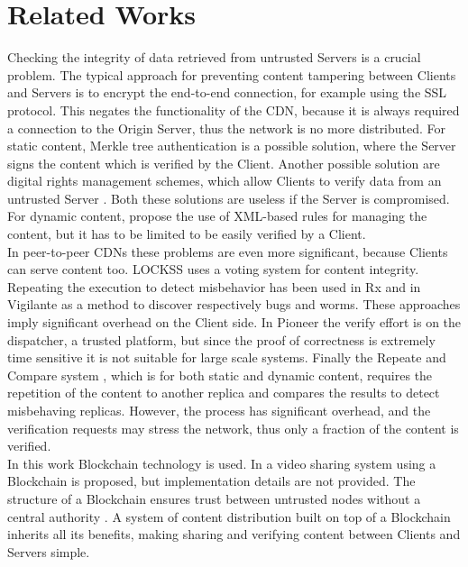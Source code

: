 \documentclass[hidelinks,conference,compsoc]{IEEEtran}
\begin{document}
\section{Related Works}
Checking the integrity of data retrieved from untrusted Servers is a crucial problem. The typical approach for preventing content tampering between Clients and Servers is to encrypt the end-to-end connection, for example using the SSL protocol.
This negates the functionality of the CDN, because it is always required a connection to the Origin Server, thus the network is no more distributed. For static content, Merkle tree authentication \cite{bayardo2005merkle} is a possible solution, where the Server signs the content which is verified by the Client. Another possible solution are digital rights management schemes, which allow Clients to verify data from an untrusted Server \cite{adelsbach2005towards}. Both these solutions are useless if the Server is compromised. 
For dynamic content, \cite{chi2002xml}\cite{orman2001data} propose the use of XML-based rules for managing the content, but it has to be limited to be easily verified by a Client.\\
In peer-to-peer CDNs these problems are even more significant, because Clients can serve content too. LOCKSS\cite{maniatis2003preserving} uses a voting system for content integrity. 
Repeating the execution to detect misbehavior has been used in Rx\cite{qin2005rx} and in Vigilante \cite{costa2005vigilante} as a method to discover respectively bugs and worms. These approaches imply significant overhead on the Client side. In Pioneer\cite{seshadri2005pioneer} the verify effort is on the dispatcher, a trusted platform, but since the proof of correctness is extremely time sensitive it is not suitable for large scale systems.
Finally the Repeate and Compare system \cite{michalakis2007ensuring}, which is for both static and dynamic content, requires the repetition of the content to another replica and compares the results to detect misbehaving replicas. However, the process has significant overhead, and the verification requests may stress the network, thus only a fraction of the content is verified.\\
In this work Blockchain technology is used. In \cite{kishigami2015blockchain} a video sharing system using a Blockchain is proposed, but implementation details are not provided. The structure of a Blockchain ensures trust between untrusted nodes without a central authority \cite{nakamoto2008bitcoin}. A system of content distribution built on top of a Blockchain inherits all its benefits, making sharing and verifying content between Clients and Servers simple. 
\end{document}
